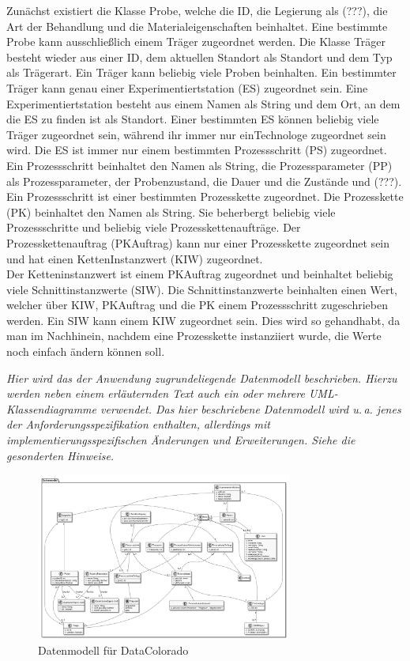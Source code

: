 \documentclass[enabledeprecatedfontcommands,fontsize=12pt,paper=a4,twoside]{scrartcl}
\begin{document}
{  Zunächst existiert die Klasse Probe, welche die ID, die Legierung als (???), die Art der Behandlung und die Materialeigenschaften beinhaltet. Eine bestimmte Probe kann ausschließlich einem Träger zugeordnet werden.
Die Klasse Träger besteht wieder aus einer ID, dem aktuellen Standort als  Standort und dem Typ als Trägerart. Ein Träger kann beliebig viele Proben beinhalten. Ein bestimmter Träger kann genau einer Experimentiertstation (ES) zugeordnet sein. Eine Experimentiertstation besteht aus einem Namen als String und dem Ort, an dem die ES zu finden ist als Standort. Einer bestimmten ES können beliebig viele Träger zugeordnet sein, während ihr immer nur einTechnologe zugeordnet sein wird. Die ES ist immer nur einem bestimmten Prozessschritt (PS) zugeordnet. Ein Prozessschritt beinhaltet den Namen als String, die Prozessparameter (PP) als Prozessparameter, der Probenzustand, die Dauer und die Zustände und (???). Ein Prozessschritt ist einer bestimmten Prozesskette zugeordnet. Die Prozesskette (PK) beinhaltet den Namen als String. Sie beherbergt beliebig viele Prozessschritte und beliebig viele Prozesskettenaufträge. Der  Prozesskettenauftrag (PKAuftrag) kann nur einer Prozesskette zugeordnet sein und hat einen KettenInstanzwert (KIW) zugeordnet. \\


Der Ketteninstanzwert ist einem PKAuftrag zugeordnet und beinhaltet beliebig viele Schnittinstanzwerte (SIW). Die Schnittinstanzwerte beinhalten einen Wert, welcher über KIW, PKAuftrag und die PK einem Prozessschritt zugeschrieben werden. Ein SIW kann einem KIW zugeordnet sein. 
Dies wird so gehandhabt, da man im Nachhinein, nachdem eine Prozesskette instanziiert wurde, die Werte noch einfach ändern können soll.
}

{\it Hier wird das der Anwendung zugrundeliegende Datenmodell
  beschrieben. Hierzu werden neben einem erläuternden Text auch ein
  oder mehrere {UML}-Klassendiagramme verwendet. Das hier beschriebene
  Datenmodell wird u.\,a. jenes der Anforderungsspezifikation enthalten,
  allerdings mit implementierungsspezifischen Änderungen und
  Erweiterungen. Siehe die gesonderten Hinweise.}
   
 \begin{figure}
  \caption{Datenmodell für DataColorado}
  \centering
  

  \includegraphics[width=0.75\textwidth]{UML/datenModel}

 \end{figure}
\end{document}
